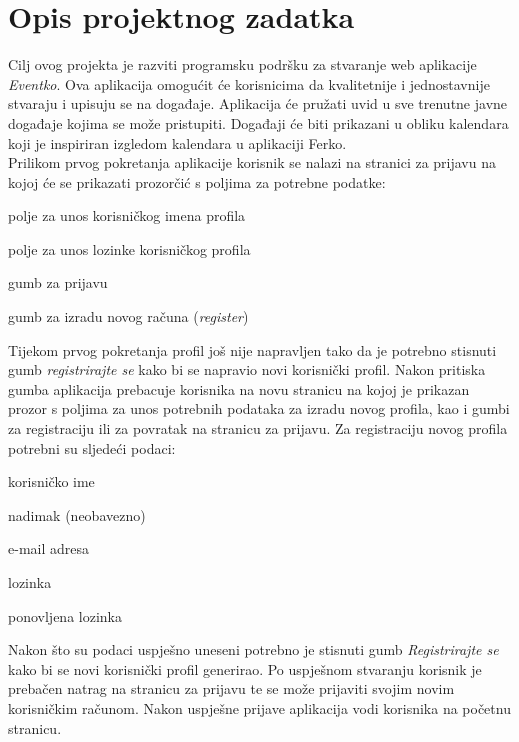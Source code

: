 \chapter{Opis projektnog zadatka}
		
		\indent Cilj ovog projekta je razviti programsku podršku za stvaranje web aplikacije \textit{Eventko}. Ova aplikacija omogućit će korisnicima da kvalitetnije i jednostavnije stvaraju i upisuju se na događaje. Aplikacija će pružati uvid u sve trenutne javne događaje kojima se može pristupiti. Događaji će biti prikazani u obliku kalendara koji je inspiriran izgledom kalendara u aplikaciji Ferko. \\
			
		\indent Prilikom prvog pokretanja aplikacije korisnik se nalazi na stranici za prijavu na kojoj će se prikazati prozorčić s poljima za potrebne podatke:
		
		\begin{packed_item}
			\item polje za unos korisničkog imena profila
			\item polje za unos lozinke korisničkog profila
			\item gumb za prijavu
			\item gumb za izradu novog računa (\textit{register})
		\end{packed_item}
		
		\indent Tijekom prvog pokretanja profil još nije napravljen tako da je potrebno stisnuti gumb \textit{registrirajte se} kako bi se napravio novi korisnički profil. Nakon pritiska gumba aplikacija prebacuje korisnika na novu stranicu na kojoj je prikazan prozor s poljima za unos potrebnih podataka za izradu novog profila, kao i gumbi za registraciju ili za povratak na stranicu za prijavu. Za registraciju novog profila potrebni su sljedeći podaci:
		
		\begin{packed_item}
			\item korisničko ime
			\item nadimak (neobavezno)
			\item e-mail adresa
			\item lozinka
			\item ponovljena lozinka			
		\end{packed_item}
	
		\indent Nakon što su podaci uspješno uneseni potrebno je stisnuti gumb \textit{Registrirajte se} kako bi se novi korisnički profil generirao. Po uspješnom stvaranju korisnik je prebačen natrag na stranicu za prijavu te se može prijaviti svojim novim korisničkim računom. Nakon uspješne prijave aplikacija vodi korisnika na početnu stranicu. \\
		

